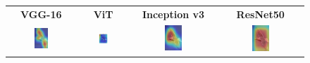 \documentclass[a4paper,12pt]{report}
\begin{document}
\begin{figure}[H]
    \centering
    \setlength{\tabcolsep}{1pt}
    \begin{tabular}{cccc}
    \textbf{VGG-16} & \textbf{ViT} & \textbf{Inception v3} & \textbf{ResNet50} \\
    
    \includegraphics[width=0.22\textwidth]{images/appendix/modelgraph/vgg/correct/Glaucous_Winged_Gull/20241204_140935.jpg} &
    \includegraphics[width=0.22\textwidth]{images/appendix/modelgraph/vit/correct/Glaucous_Winged_Gull/20241204_140935.jpg} &
    \includegraphics[width=0.22\textwidth]{images/appendix/modelgraph/inception/correct/Glaucous_Winged_Gull/20241204_140935.jpg} &
    \includegraphics[width=0.22\textwidth]{images/appendix/modelgraph/resnet/correct/Glaucous_Winged_Gull/20241204_140935.jpg} \\
    \end{tabular}
 
    \label{fig:interpretability_glaucous_2}
\end{figure}
\end{document}
